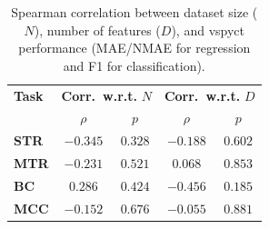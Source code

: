 \documentclass[3p,review,authoryear]{elsarticle}
\begin{document}
\begin{table}[h!]
\centering
\caption{Spearman correlation between dataset size ($N$), number of features ($D$), and \gls{vspyct} performance (MAE/NMAE for regression and F1 for classification).}
\label{tab:vspyct_correlation}
\begin{tabular}{@{}lcccc@{}}
\toprule
\textbf{Task} & \multicolumn{2}{c}{\textbf{Corr.\ w.r.t. }$N$} & \multicolumn{2}{c}{\textbf{Corr.\ w.r.t. }$D$} \\
\cmidrule(lr){2-3}\cmidrule(lr){4-5}
 & $\rho$ & $p$ & $\rho$ & $p$ \\
\midrule
\textbf{STR} & $-0.345$ & $0.328$ & $-0.188$ & $0.602$\\
\textbf{MTR} & $-0.231$ & $0.521$ & $0.068$ & $0.853$\\
\textbf{BC}  & $0.286$  & $0.424$ & $-0.456$ & $0.185$\\
\textbf{MCC} & $-0.152$ & $0.676$ & $-0.055$ & $0.881$\\
\bottomrule
\end{tabular}
\end{table}
\end{document}
